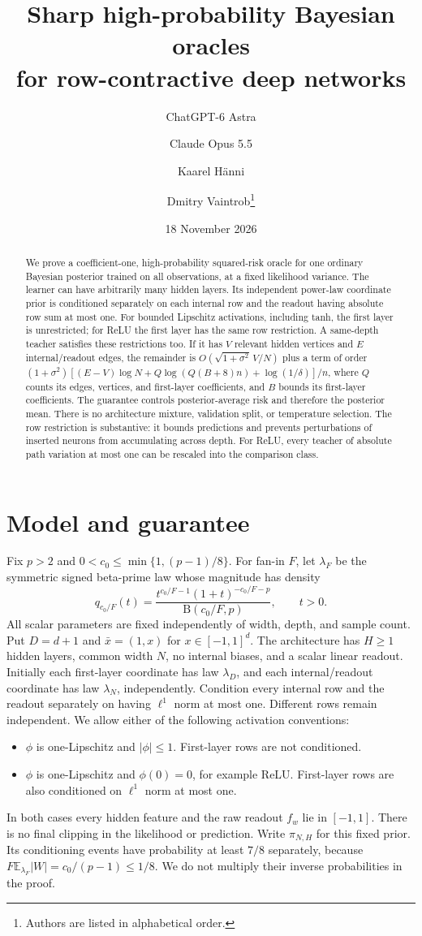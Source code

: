 \documentclass[11pt]{article}
\title{Sharp high-probability Bayesian oracles\\for row-contractive deep networks}
\author{ChatGPT-6 Astra \and Claude Opus 5.5 \and Kaarel H\"anni \and Dmitry Vaintrob\thanks{Authors are listed in alphabetical order.}}
\date{18 November 2026}
\newcommand{\E}{\mathbb E}
\begin{document}
\maketitle
\begin{abstract}
We prove a coefficient-one, high-probability squared-risk oracle for one ordinary Bayesian posterior trained on all observations, at a fixed likelihood variance. The learner can have arbitrarily many hidden layers. Its independent power-law coordinate prior is conditioned separately on each internal row and the readout having absolute row sum at most one. For bounded Lipschitz activations, including tanh, the first layer is unrestricted; for ReLU the first layer has the same row restriction. A same-depth teacher satisfies these restrictions too. If it has $V$ relevant hidden vertices and $E$ internal/readout edges, the remainder is $O(\sqrt{1+\sigma^2}\,V/N)$ plus a term of order
$ (1+\sigma^2)[(E-V)\log N+Q\log(Q(B+8)n)+\log(1/\delta)]/n$,
where $Q$ counts its edges, vertices, and first-layer coefficients, and $B$ bounds its first-layer coefficients. The guarantee controls posterior-average risk and therefore the posterior mean. There is no architecture mixture, validation split, or temperature selection. The row restriction is substantive: it bounds predictions and prevents perturbations of inserted neurons from accumulating across depth. For ReLU, every teacher of absolute path variation at most one can be rescaled into the comparison class.
\end{abstract}

\section{Model and guarantee}
Fix $p>2$ and $0<c_0\le\min\{1,(p-1)/8\}$. For fan-in $F$, let $\lambda_F$ be the symmetric signed beta-prime law whose magnitude has density
\[
 q_{c_0/F}(t)=\frac{t^{c_0/F-1}(1+t)^{-c_0/F-p}}{\mathrm B(c_0/F,p)},\qquad t>0.
\]
All scalar parameters are fixed independently of width, depth, and sample count. Put $D=d+1$ and $\bar x=(1,x)$ for $x\in[-1,1]^d$. The architecture has $H\ge1$ hidden layers, common width $N$, no internal biases, and a scalar linear readout. Initially each first-layer coordinate has law $\lambda_D$, and each internal/readout coordinate has law $\lambda_N$, independently. Condition every internal row and the readout separately on having $\ell^1$ norm at most one. Different rows remain independent. We allow either of the following activation conventions:
\begin{itemize}
\item $\phi$ is one-Lipschitz and $|\phi|\le1$. First-layer rows are not conditioned.
\item $\phi$ is one-Lipschitz and $\phi(0)=0$, for example ReLU. First-layer rows are also conditioned on $\ell^1$ norm at most one.
\end{itemize}
In both cases every hidden feature and the raw readout $f_w$ lie in $[-1,1]$. There is no final clipping in the likelihood or prediction. Write $\pi_{N,H}$ for this fixed prior. Its conditioning events have probability at least $7/8$ separately, because $F\E_{\lambda_F}|W|=c_0/(p-1)\le1/8$. We do not multiply their inverse probabilities in the proof.
\end{document}
